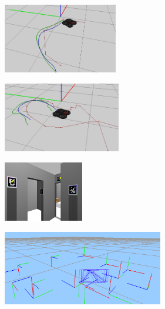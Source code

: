 \documentclass[notes,slidesec,a4]{seminar}
\begin{document}
\begin{hslide}

\begin{center}
	\begin{figure}
		\centering
		\begin{subfigure}
			\centering
			\includegraphics[width=5cm]{img/rutacurvas}
		\end{subfigure}%
		\begin{subfigure}
			\centering
			\includegraphics[width=5.13cm]{img/rutacompleja}
		\end{subfigure}
	\end{figure}
\end{center}

\end{hslide}


\begin{hslide}

\begin{center}
	\begin{figure}
		\centering
		\begin{subfigure}
			\centering
			\includegraphics[width=3.5cm]{img/pisoloc2cam}
		\end{subfigure}%
		\begin{subfigure}
			\centering
			\includegraphics[width=7cm]{img/pisoloc2}
		\end{subfigure}
	\end{figure}
\end{center}	

\end{hslide}
\end{document}

